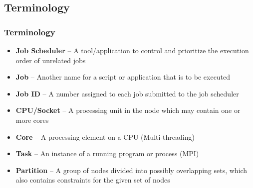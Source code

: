 \subsection{Terminology}
\begin{frame}
	\frametitle{Terminology}
	\begin{itemize}
          \item \textbf{Job Scheduler} -- A tool/application to control and prioritize the execution order of unrelated jobs 
          \item \textbf{Job} -- Another name for a script or application that is to be executed
          \item \textbf{Job ID} -- A number assigned to each job submitted to the job scheduler
	  \item \textbf{CPU/Socket} -- A processing unit in the node which may contain one or more cores
	  \item \textbf{Core} -- A processing element on a CPU  (Multi-threading)
	  \item \textbf{Task} -- An instance of a running program or process (MPI)
	  \item \textbf{Partition} -- A group of nodes divided into possibly overlapping sets, which also contains constraints for the given set of nodes
            
	\end{itemize}
\end{frame}


